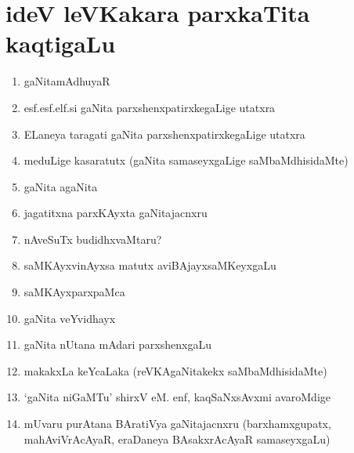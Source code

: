 \chapter{ideV leVKakara parxkaTita kaqtigaLu}

\begin{enumerate}
\renewcommand{\labelenumi}{\rm(\theenumi)}
\item gaNitamAdhuyaR
  
\item esf.esf.elf.si gaNita parxshenxpatirxkegaLige utatxra

\item ELaneya taragati gaNita parxshenxpatirxkegaLige utatxra

\item meduLige kasaratutx (gaNita samaseyxgaLige saMbaMdhisidaMte)

\item gaNita agaNita

\item jagatitxna parxKAyxta gaNitajacnxru

\item nAveSuTx budidhxvaMtaru?

\item saMKAyxvinAyxsa matutx aviBAjayxsaMKeyxgaLu 

\item saMKAyxparxpaMca

\item gaNita veYvidhayx

\item gaNita nUtana mAdari parxshenxgaLu

\item makakxLa keYcaLaka (reVKAgaNitakekx saMbaMdhisidaMte)

\item `gaNita niGaMTu' shirxV eM. enf, kaqSaNxsAvxmi avaroMdige  
  
\item mUvaru purAtana BAratiVya gaNitajacnxru (barxhamxgupatx, mahAviVrAcAyaR, eraDaneya BAsakxrAcAyaR samaseyxgaLu)
  
\end{enumerate}
